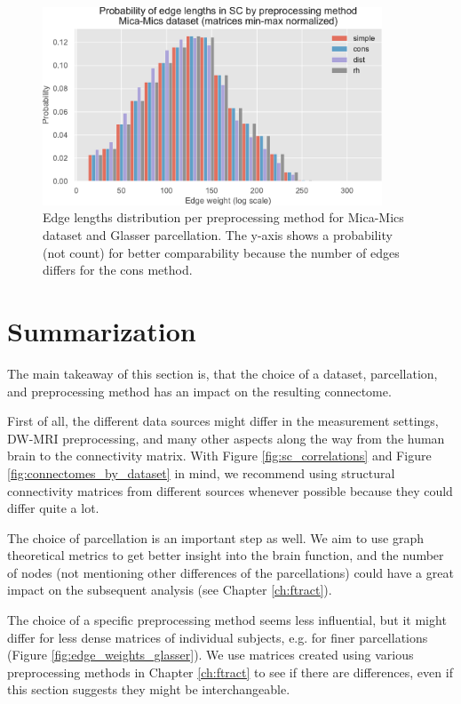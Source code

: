 \begin{figure}[h!]
  \begin{center}
    \includegraphics[width=0.9\textwidth]{images/nootebook_generated/comparing_sc_matrices/MNI-HCP-MMP1/Probability_of_edge_lengths_in_SC_by_preprocessing_method_Mica-Mics_dataset_(matrices_min-max_normalized).pdf}
  \end{center}
  \caption[Edge lengths distribution per preprocessing method]{Edge lengths distribution per preprocessing method for Mica-Mics dataset and Glasser parcellation. The y-axis shows a probability (not count) for better comparability because the number of edges differs for the cons method.}
  \label{fig:edge_lengths_glasser}
\end{figure}

\section{Summarization}

The main takeaway of this section is, that the choice of a dataset, parcellation, and preprocessing method has an impact on the resulting connectome. 

First of all, the different data sources might differ in the measurement settings, DW-MRI preprocessing, and many other aspects along the way from the human brain to the connectivity matrix. With Figure \ref{fig:sc_correlations} and Figure \ref{fig:connectomes_by_dataset} in mind, we recommend using structural connectivity matrices from different sources whenever possible because they could differ quite a lot.

The choice of parcellation is an important step as well. We aim to use graph theoretical metrics to get better insight into the brain function, and the number of nodes (not mentioning other differences of the parcellations) could have a great impact on the subsequent analysis (see Chapter \ref{ch:ftract}).

The choice of a specific preprocessing method seems less influential, but it might differ for less dense matrices of individual subjects, e.g. for finer parcellations (Figure \ref{fig:edge_weights_glasser}). We use matrices created using various preprocessing methods in Chapter \ref{ch:ftract} to see if there are differences, even if this section suggests they might be interchangeable.